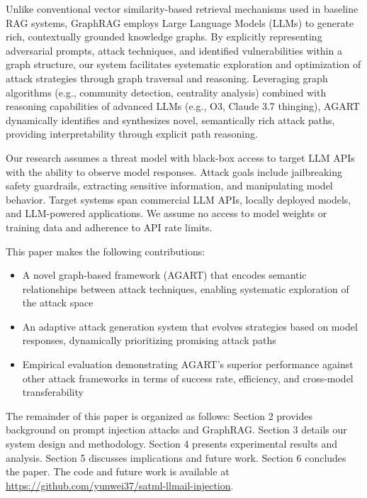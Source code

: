 Unlike conventional vector similarity-based retrieval mechanisms used in baseline RAG systems, GraphRAG employs Large Language Models (LLMs) to generate rich, contextually grounded knowledge graphs. By explicitly representing adversarial prompts, attack techniques, and identified vulnerabilities within a graph structure, our system facilitates systematic exploration and optimization of attack strategies through graph traversal and reasoning. Leveraging graph algorithms (e.g., community detection, centrality analysis) combined with reasoning capabilities of advanced LLMs (e.g., O3, Claude 3.7 thinging), AGART dynamically identifies and synthesizes novel, semantically rich attack paths, providing interpretability through explicit path reasoning.

Our research assumes a threat model with black-box access to target LLM APIs with the ability to observe model responses. Attack goals include jailbreaking safety guardrails, extracting sensitive information, and manipulating model behavior. Target systems span commercial LLM APIs, locally deployed models, and LLM-powered applications. We assume no access to model weights or training data and adherence to API rate limits.

This paper makes the following contributions:
\begin{itemize}
\item A novel graph-based framework (AGART) that encodes semantic relationships between attack techniques, enabling systematic exploration of the attack space
\item An adaptive attack generation system that evolves strategies based on model responses, dynamically prioritizing promising attack paths
\item Empirical evaluation demonstrating AGART's superior performance against other attack frameworks in terms of success rate, efficiency, and cross-model transferability
\end{itemize}

The remainder of this paper is organized as follows: Section 2 provides background on prompt injection attacks and GraphRAG. Section 3 details our system design and methodology. Section 4 presents experimental results and analysis. Section 5 discusses implications and future work. Section 6 concludes the paper. The code and future work is available at \url{https://github.com/yunwei37/satml-llmail-injection}.
